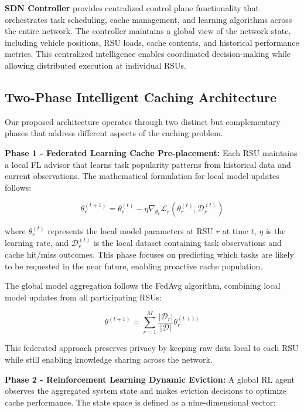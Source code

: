 \documentclass[11pt]{article}
\begin{document}
\textbf{SDN Controller} provides centralized control plane functionality that orchestrates task scheduling, cache management, and learning algorithms across the entire network. The controller maintains a global view of the network state, including vehicle positions, RSU loads, cache contents, and historical performance metrics. This centralized intelligence enables coordinated decision-making while allowing distributed execution at individual RSUs.

\subsection{Two-Phase Intelligent Caching Architecture}

Our proposed architecture operates through two distinct but complementary phases that address different aspects of the caching problem.

\textbf{Phase 1 - Federated Learning Cache Pre-placement:}
Each RSU maintains a local FL advisor that learns task popularity patterns from historical data and current observations. The mathematical formulation for local model updates follows:

\begin{equation}
\theta_r^{(t+1)} = \theta_r^{(t)} - \eta \nabla_{\theta_r} \mathcal{L}_r(\theta_r^{(t)}, \mathcal{D}_r^{(t)})
\end{equation}

where $\theta_r^{(t)}$ represents the local model parameters at RSU $r$ at time $t$, $\eta$ is the learning rate, and $\mathcal{D}_r^{(t)}$ is the local dataset containing task observations and cache hit/miss outcomes. This phase focuses on predicting which tasks are likely to be requested in the near future, enabling proactive cache population.

The global model aggregation follows the FedAvg algorithm, combining local model updates from all participating RSUs:

\begin{equation}
\theta^{(t+1)} = \sum_{r=1}^{M} \frac{|\mathcal{D}_r|}{|\mathcal{D}|} \theta_r^{(t+1)}
\end{equation}

This federated approach preserves privacy by keeping raw data local to each RSU while still enabling knowledge sharing across the network.

\textbf{Phase 2 - Reinforcement Learning Dynamic Eviction:}
A global RL agent observes the aggregated system state and makes eviction decisions to optimize cache performance. The state space is defined as a nine-dimensional vector:
\end{document}
